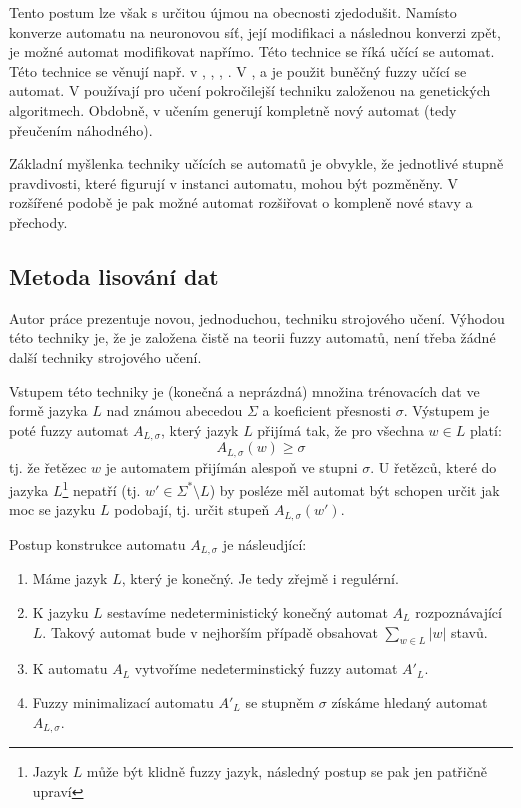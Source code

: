 \documentclass[a4paper,10pt]{article}
\begin{document}
Tento postum lze však s určitou újmou na obecnosti zjedodušit. Namísto konverze automatu na neuronovou síť, její modifikaci a následnou konverzi zpět, je možné automat modifikovat napřímo. Této technice se říká učící se automat. Této technice se věnují např. v \cite{FuLi-ForLeaAutAutGam}, \cite{WeeFu-FormFuzAutAppModLeaSys}, \cite{GilOmlTho-EquKnoRep+}, \cite{TzaRig-StaAnaAdaFuzzConSysUsiPetrNetLeaAut}. V \cite{PatMor-EdgDetTecFuzzLogCEllLeaAutFuzzImPro}, \cite{MarMeySol-HybMetGasDifModFuzCelAutImSha} a \cite{SinGha+HybrEdgDetMetFuzSetTheCelLeaAut} je použit buněčný fuzzy učící se automat. V \cite{AstGariGonVillFar-ApprStrMatUsiDefFuzzAutLearExpr} používají pro učení pokročilejší techniku založenou na genetických algoritmech. Obdobně, v \cite{ZhiMinLan-EvoStraIndFuFiStaAu} učením generují kompletně nový automat (tedy přeučením náhodného).

Základní myšlenka techniky učících se automatů je obvykle, že jednotlivé stupně pravdivosti, které figurují v instanci automatu, mohou být pozměněny. V rozšířené podobě je pak možné automat rozšiřovat o kompleně nové stavy a přechody.

\subsection{Metoda lisování dat}
Autor práce prezentuje novou, jednoduchou, techniku strojového učení. Výhodou této techniky je, že je založena čistě na teorii fuzzy automatů, není třeba žádné další techniky strojového učení.

Vstupem této techniky je (konečná a neprázdná) množina trénovacích dat ve formě jazyka $L$ nad známou abecedou $\Sigma$ a koeficient přesnosti $\sigma$. Výstupem je poté fuzzy automat $A_{L,\sigma}$, který jazyk $L$ přijímá tak, že pro všechna $w \in L$ platí:
$$
  A_{L,\sigma}(w) \geq \sigma
$$
tj. že řetězec $w$ je automatem přijímán alespoň ve stupni $\sigma$. U řetězců, které do jazyka $L$\footnote{Jazyk $L$ může být klidně fuzzy jazyk, následný postup se pak jen patřičně upraví} nepatří (tj. $w' \in \Sigma^* \setminus L$) by posléze měl automat být schopen určit jak moc se jazyku $L$ podobají, tj. určit stupeň $A_{L,\sigma}(w')$.

Postup konstrukce automatu $A_{L,\sigma}$ je násleudjící:
\begin{enumerate}
 \item Máme jazyk $L$, který je konečný. Je tedy zřejmě i regulérní.
 \item K jazyku $L$ sestavíme nedeterministický konečný automat $A_{L}$ rozpoznávající $L$. Takový automat bude v nejhorším případě obsahovat $\sum_{w \in L} |w|$ stavů.
 \item K automatu $A_{L}$ vytvoříme nedeterminstický fuzzy automat $A'_{L}$.
 \item Fuzzy minimalizací automatu $A'_{L}$ se stupněm $\sigma$ získáme hledaný automat $A_{L,\sigma}$.
\end{enumerate}
\end{document}
